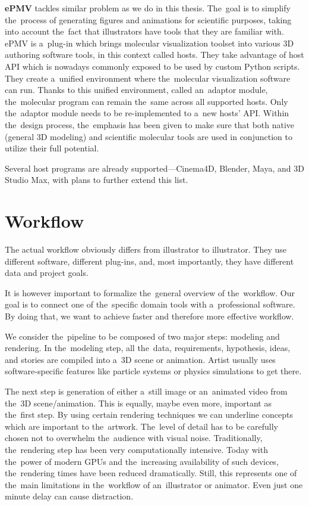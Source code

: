 \documentclass[
  digital, %
  table,   %
  nolof,     %
  nolot,     %
  oneside,
]{fithesis3}
\begin{document}
\textbf{ePMV} \cite{ePMV} tackles similar problem as we do in this thesis. The goal is to simplify the process of generating figures and animations for scientific purposes, taking into account the fact that illustrators have tools that they are familiar with. ePMV is a plug-in which brings molecular visualization toolset into various 3D authoring software tools, in this context called hosts. They take advantage of host API which is nowadays commonly exposed to be used by custom Python scripts. They create a unified environment where the molecular visualization software can run. Thanks to this unified environment, called an adaptor module, the molecular program can remain the same across all supported hosts. Only the adaptor module needs to be re-implemented to a new hosts' API. Within the design process, the emphasis has been given to make sure that both native (general 3D modeling) and scientific molecular tools are used in conjunction to utilize their full potential.

Several host programs are already supported—Cinema4D, Blender, Maya, and 3D Studio Max, with plans to further extend this list.

\section{Workflow}
The actual workflow obviously differs from illustrator to illustrator. They use different software, different plug-ins, and, most importantly, they have different data and project goals.

It is however important to formalize the general overview of the workflow. Our goal is to connect one of the specific domain tools with a professional software. By doing that, we want to achieve faster and therefore more effective workflow.

We consider the pipeline to be composed of two major steps: modeling and rendering. In the modeling step, all the data, requirements, hypothesis, ideas, and stories are compiled into a 3D scene or animation. Artist usually uses software-specific features like particle systems or physics simulations to get there.

The next step is generation of either a still image or an animated video from the 3D scene/animation. This is equally, maybe even more, important as the first step. By using certain rendering techniques we can underline concepts which are important to the artwork. The level of detail has to be carefully chosen not to overwhelm the audience with visual noise. Traditionally, the rendering step has been very computationally intensive. Today with the power of modern GPUs and the increasing availability of such devices, the rendering times have been reduced dramatically. Still, this represents one of the main limitations in the workflow of an illustrator or animator. Even just one minute delay can cause distraction.
\end{document}
